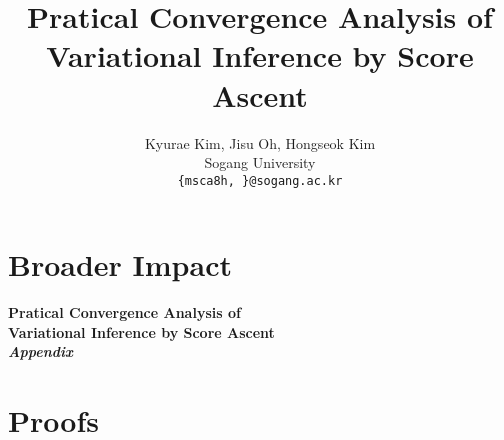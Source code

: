 \documentclass{article}
\title{Pratical Convergence Analysis of \\ Variational Inference by Score Ascent}
\author{%
  Kyurae Kim, Jisu Oh, Hongseok Kim \\
  Sogang University \\
  \texttt{\{msca8h, \}@sogang.ac.kr} \\
}
\begin{document}
\maketitle

\begin{abstract}
  
\end{abstract}








\section*{Broader Impact}




\newpage
\appendix

\begin{center}
  \LARGE\bf
  Pratical Convergence Analysis of \\
  Variational Inference by Score Ascent \\
  \textit{Appendix}
\end{center}






\section{Proofs}\label{section:proofs}
%
%
\printProofs
\end{document}
